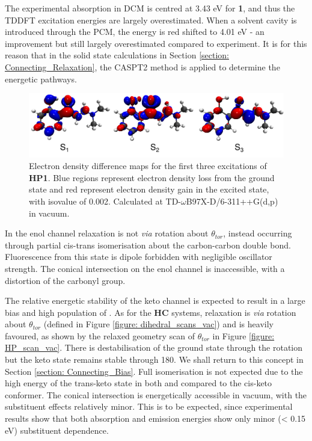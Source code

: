 The experimental absorption in DCM is centred at 3.43 eV for \textbf{1}, and thus the TDDFT excitation energies are largely overestimated. When a solvent cavity is introduced through the \ac{PCM}, the \sone{} energy is red shifted to 4.01 eV - an improvement but still largely overestimated compared to experiment. It is for this reason that in the solid state calculations in Section \ref{section: Connecting_Relaxation}, the CASPT2 method is applied to determine the energetic pathways.
\begin{figure}[t]
\centering
  \includegraphics[width=0.9\linewidth]{5ConnectingCrystalStructure/monomer_excitations.pdf}
  \caption[Electron density difference maps for the first three excitations of \textbf{HP1}.]{Electron density difference maps for the first three excitations of \textbf{HP1}. Blue regions represent electron density loss from the ground state and red represent electron density gain in the excited state, with isovalue of 0.002. Calculated at TD-$\omega$B97X-D/6-311++G(d,p) in vacuum.}
  \label{figure: monomer_excitations}
\end{figure}

In the enol channel relaxation is not \textit{via} rotation about $\theta_{tor}$, instead occurring through partial cis-trans isomerisation about the carbon-carbon double bond. Fluorescence from this state is dipole forbidden with negligible oscillator strength. The conical intersection on the enol channel is inaccessible, with a distortion of the carbonyl group. 

The relative energetic stability of the keto channel is expected to result in a large bias and high population of \Kstar{}. As for the \textbf{HC} systems, relaxation is \textit{via} rotation about $\theta_{tor}$ (defined in Figure \ref{figure: dihedral_scans_vac}) and is heavily favoured, as shown by the relaxed geometry scan of $\theta_{tor}$ in Figure \ref{figure: HP_scan_vac}. There is destabilisation of the ground state through the rotation but the keto state remains stable through 180\degree{}. We shall return to this concept in Section \ref{section: Connecting_Bias}. Full isomerisation is not expected due to the high energy of the trans-keto state in both \sone{} and \szero{} compared to the cis-keto conformer. The conical intersection is energetically accessible in vacuum, with the substituent effects relatively minor. This is to be expected, since experimental results show that both absorption and emission energies show only minor (\textless{} 0.15 eV) substituent dependence. 


